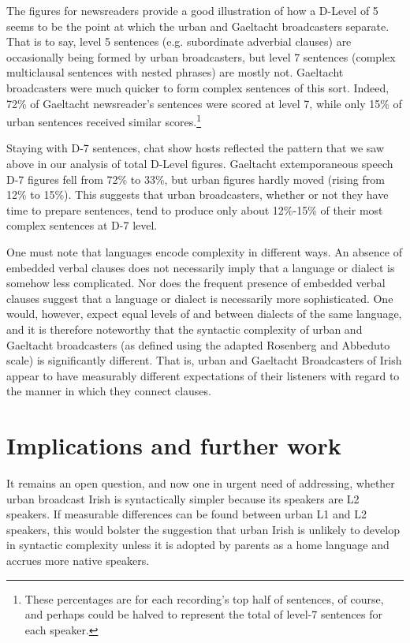 \documentclass[output=paper,colorlinks,citecolor=brown]{langscibook}
\begin{document}
The figures for newsreaders provide a good illustration of how a D-Level of 5 seems to be the point at which the urban and Gaeltacht broadcasters separate. That is to say, level 5 sentences (e.g. subordinate adverbial clauses) are occasionally being formed by urban broadcasters, but level 7 sentences (complex multiclausal sentences with nested phrases) are mostly not. Gaeltacht broadcasters were much quicker to form complex sentences of this sort. Indeed, 72\% of Gaeltacht newsreader's sentences were scored at level 7, while only 15\% of urban sentences received similar scores.\footnote{These percentages are for each recording's top half of sentences, of course, and perhaps could be halved to represent the total of level-7 sentences for each speaker.} 

Staying with D-7 sentences, chat show hosts reflected the pattern that we saw above in our analysis of total D-Level figures. Gaeltacht extemporaneous speech D-7 figures fell from 72\% to 33\%, but urban figures hardly moved (rising from 12\% to 15\%). This suggests that urban broadcasters, whether or not they have time to prepare sentences, tend to produce only about 12\%-15\% of their most complex sentences at D-7 level.

One must note that languages encode complexity in different ways. An absence of embedded verbal clauses does not necessarily imply that a language or dialect is somehow less complicated. Nor does the frequent presence of embedded verbal clauses suggest that a language or dialect is necessarily more sophisticated. One would, however, expect equal levels of  and  between dialects of the same language, and it is therefore noteworthy that the syntactic complexity of urban and Gaeltacht broadcasters (as defined using the adapted Rosenberg and Abbeduto scale) is significantly different. That is, urban and Gaeltacht Broadcasters of Irish appear to have measurably different expectations of their listeners with regard to the manner in which they connect clauses.

\section{Implications and further work}

It remains an open question, and now one in urgent need of addressing, whether urban broadcast Irish is syntactically simpler because its speakers are L2 speakers. If measurable differences can be found between urban L1 and L2 speakers, this would bolster the suggestion that urban Irish is unlikely to develop in syntactic complexity unless it is adopted by parents as a home language and accrues more native speakers.
\end{document}
